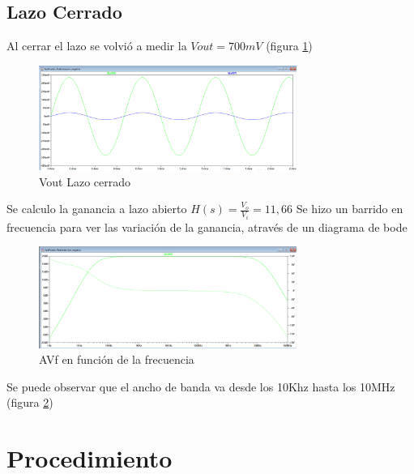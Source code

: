 \documentclass[12pt, letterpaper]{article}
\begin{document}
\subsection{Lazo Cerrado}
Al cerrar el lazo se volvió a medir la $Vout=700mV$ (figura \ref{fig:vof})
\begin{figure}[H]
	\centering
	\includegraphics[width=0.75\textwidth]{Imagenes/Avf.png}
	\caption{Vout Lazo cerrado}
	\label{fig:vof}
\end{figure}
Se calculo la ganancia a lazo abierto $H(s)=\frac{V_o}{V_i} = 11,66$
Se hizo un barrido en frecuencia para ver las variación de la ganancia, através de un diagrama de bode 
\begin{figure}[H]
	\centering
	\includegraphics[width=0.75\textwidth]{Imagenes/lazoCerrado.png}
	\caption{AVf en función de la frecuencia}
	\label{fig:bode_lazo_cerrado}
\end{figure}
Se puede observar que el ancho de banda va desde los 10Khz hasta los 10MHz (figura \ref{fig:bode_lazo_cerrado})





\section{Procedimiento}
\end{document}
